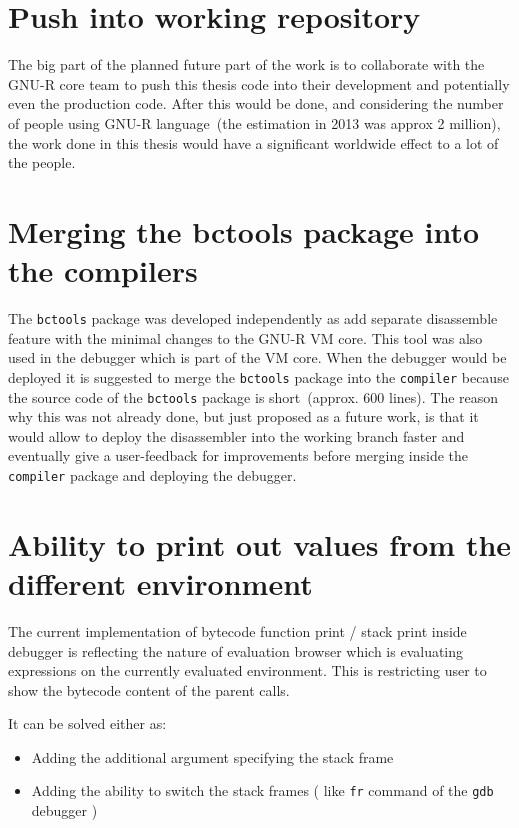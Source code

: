 \documentclass[thesis=M,english]{FITthesis}[2018/10/20]
\newcommand{\code}[1]{\texttt{#1}}
\begin{document}
{\section{Push into working repository}

The big part of the planned future part of the work is to collaborate with the GNU-R core team to push this thesis code into their development and potentially even the production code. After this would be done, and considering the number of people using GNU-R language~(the estimation in 2013 was approx 2 million), the work done in this thesis would have a significant worldwide effect to a lot of the people.

\section{Merging the bctools package into the compilers}

The \code{bctools} package was developed independently as add separate disassemble feature with the minimal changes to the GNU-R VM core. This tool was also used in the debugger which is part of the VM core. When the debugger would be deployed it is suggested to merge the \code{bctools} package into the \code{compiler} because the source code of the \code{bctools} package is short~(approx. 600 lines). The reason why this was not already done, but just proposed as a future work, is that it would allow to deploy the disassembler into the working branch faster and eventually give a user-feedback for improvements before merging inside the \code{compiler} package and deploying the debugger.

\section{Ability to print out values from the different environment}\label{ability-to-print-different-environment}

The current implementation of bytecode function print / stack print inside debugger is reflecting the nature of evaluation browser which is evaluating expressions on the currently evaluated environment. This is restricting user to show the bytecode content of the parent calls. 

It can be solved either as:
\begin{itemize}
	\item Adding the additional argument specifying the stack frame 
	\item Adding the ability to switch the stack frames ( like \code{fr} command of the \code{gdb} debugger )
\end{itemize}

}
\end{document}
